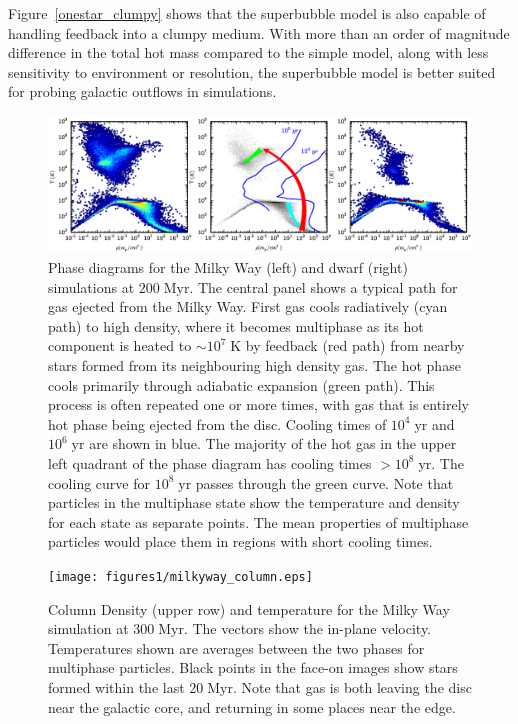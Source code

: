 Figure~\ref{onestar_clumpy} shows that the superbubble model is also capable of
handling feedback into a clumpy medium.  With more than an order of magnitude
difference in the total hot mass compared to the simple model, along with less
sensitivity to environment or resolution, the superbubble model is better
suited for probing galactic outflows in simulations.  


\begin{figure}
    \includegraphics[width=\textwidth]{figures1/disc_phase.eps}
    \caption[Phase diagram of gas in isolated galaxies]{Phase diagrams for the
    Milky Way (left) and dwarf (right) simulations at $200\;\mathrm{Myr}$.  The
    central panel shows a typical path for gas ejected from the Milky Way.
    First gas cools radiatively (cyan path) to high density, where it becomes
    multiphase as its hot component is heated to $\sim10^7\;\mathrm{K}$ by
    feedback (red path) from nearby stars formed from its neighbouring high
    density gas.  The hot phase cools primarily through adiabatic expansion
    (green path).  This process is often repeated one or more times, with gas
    that is entirely hot phase being ejected from the disc.  Cooling times of
    $10^4\;\mathrm{yr}$ and $10^6\;\mathrm{yr}$ are shown in blue. The
    majority of the hot gas in the upper left quadrant of the phase diagram has
    cooling times $>10^8\;\mathrm{yr}$.  The cooling curve for
    $10^8\;\mathrm{yr}$ passes through the green curve.  Note that particles in
    the multiphase state show the temperature and density for each state as
    separate points.  The mean properties of multiphase particles would place
    them in regions with short cooling times.}
    \label{disc_phase}
\end{figure}

\begin{figure}
    \texttt{[image: figures1/milkyway\_column.eps]}
    \caption[Column density and temperature images of isolated Milky Way]{Column
    Density (upper row) and temperature for the Milky Way simulation at
    $300\;\mathrm{Myr}$.  The vectors show the in-plane velocity.  Temperatures
    shown are averages between the two phases for multiphase particles.  Black
    points in the face-on images show stars formed within the last
    $20\;\mathrm{Myr}$. Note that gas is both leaving the disc near the galactic
    core, and returning in some places near the edge.}
    \label{milkyway_column}
\end{figure}

